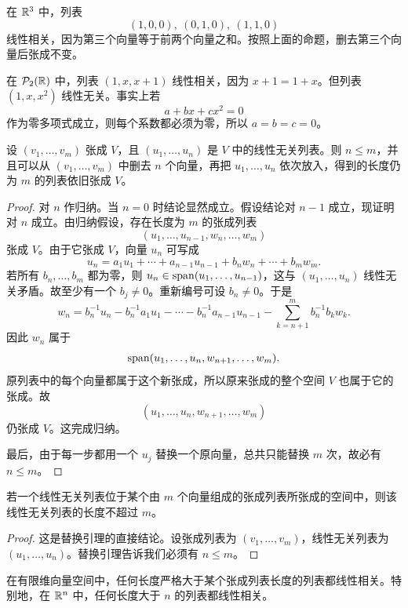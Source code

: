\begin{example} 在 $\mathbb{R}^3$ 中，列表
\[ (1,0,0),\ (0,1,0),\ (1,1,0) \]
线性相关，因为第三个向量等于前两个向量之和。按照上面的命题，删去第三个向量后张成不变。
\end{example}

\begin{example} 在 $\mathcal{P}_2(\mathbb{R})$ 中，列表 $(1,x,x+1)$ 线性相关，因为 $x+1=1+x$。但列表 $(1,x,x^2)$ 线性无关。事实上若
\[ a+bx+cx^2=0 \]
作为零多项式成立，则每个系数都必须为零，所以 $a=b=c=0$。
\end{example}

\begin{lemma}[替换引理] 设 $(v_1,\dots,v_m)$ 张成 $V$，且 $(u_1,\dots,u_n)$ 是 $V$ 中的线性无关列表。则 $n\le m$，并且可以从 $(v_1,\dots,v_m)$ 中删去 $n$ 个向量，再把 $u_1,\dots,u_n$ 依次放入，得到的长度仍为 $m$ 的列表依旧张成 $V$。
\end{lemma}

\begin{proof} 对 $n$ 作归纳。当 $n=0$ 时结论显然成立。假设结论对 $n-1$ 成立，现证明对 $n$ 成立。由归纳假设，存在长度为 $m$ 的张成列表
\[ (u_1,\dots,u_{n-1},w_n,\dots,w_m) \]
张成 $V$。由于它张成 $V$，向量 $u_n$ 可写成
\[ u_n=a_1u_1+\cdots+a_{n-1}u_{n-1}+b_nw_n+\cdots+b_mw_m. \]
若所有 $b_n,\dots,b_m$ 都为零，则 $u_n\in\operatorname{span}(u_1,\dots,u_{n-1})$，这与 $(u_1,\dots,u_n)$ 线性无关矛盾。故至少有一个 $b_j\neq 0$。重新编号可设 $b_n\neq 0$。于是
\[ w_n=b_n^{-1}u_n-b_n^{-1}a_1u_1-\cdots-b_n^{-1}a_{n-1}u_{n-1}-\sum_{k=n+1}^m b_n^{-1}b_kw_k. \]
因此 $w_n$ 属于
\[ \operatorname{span}(u_1,\dots,u_n,w_{n+1},\dots,w_m). \]
原列表中的每个向量都属于这个新张成，所以原来张成的整个空间 $V$ 也属于它的张成。故
\[ (u_1,\dots,u_n,w_{n+1},\dots,w_m) \]
仍张成 $V$。这完成归纳。

最后，由于每一步都用一个 $u_j$ 替换一个原向量，总共只能替换 $m$ 次，故必有 $n\le m$。
\end{proof}

\begin{theorem} 若一个线性无关列表位于某个由 $m$ 个向量组成的张成列表所张成的空间中，则该线性无关列表的长度不超过 $m$。
\end{theorem}

\begin{proof} 这是替换引理的直接结论。设张成列表为 $(v_1,\dots,v_m)$，线性无关列表为 $(u_1,\dots,u_n)$。替换引理告诉我们必须有 $n\le m$。
\end{proof}

\begin{corollary} 在有限维向量空间中，任何长度严格大于某个张成列表长度的列表都线性相关。特别地，在 $\mathbb{R}^n$ 中，任何长度大于 $n$ 的列表都线性相关。
\end{corollary}

